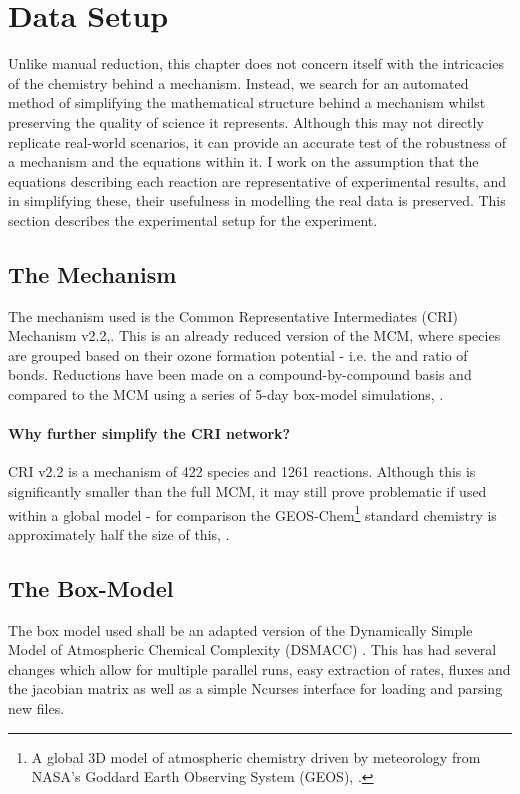 \section{Data Setup}
Unlike manual reduction, this chapter does not concern itself with the intricacies of the chemistry behind a mechanism. Instead, we search for an automated method of simplifying the mathematical structure behind a mechanism whilst preserving the quality of science it represents. Although this may not directly replicate real-world scenarios, it can provide an accurate test of the robustness of a mechanism and the equations within it. I work on the assumption that the equations describing each reaction are representative of experimental results, and in simplifying these, their usefulness in modelling the real data is preserved. This section describes the experimental setup for the experiment.


\subsection{The Mechanism}
The mechanism used is the Common Representative Intermediates (CRI) Mechanism v2.2,\citep{criv2}. This is an already reduced version of the MCM, where species are grouped based on their ozone formation potential - i.e. the  and  ratio of bonds. 
Reductions have been made on a compound-by-compound basis and compared to the MCM using a series of 5-day box-model simulations, \citep{cri}. 

\paragraph*{Why further simplify the CRI network?}\label{sec:whycri}

CRI v2.2 is a mechanism of 422 species and 1261 reactions. Although this is significantly smaller than the full MCM, it may still prove problematic if used within a global model - for comparison the GEOS-Chem\footnote{A global 3D model of atmospheric chemistry driven by meteorology from NASA's Goddard Earth Observing System (GEOS), \citep{geos}.} standard chemistry is approximately half the size of this, \cite{geosgit}.

\subsection{The Box-Model}
The box model used shall be an adapted version of the Dynamically Simple Model of Atmospheric Chemical Complexity (DSMACC) \cite{dsmacc,dsmaccgit}. This has had several changes which allow for multiple parallel runs, easy extraction of rates, fluxes and the jacobian matrix as well as a simple Ncurses interface for loading and parsing new files. 

